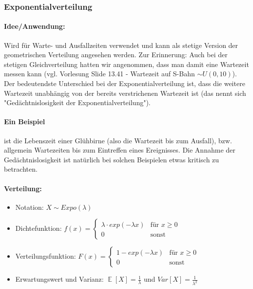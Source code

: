 \documentclass[a4paper]{article}
\DeclareMathOperator*{\E}{\mathbb{E}}
\begin{document}
\noindent {}


\subsubsection{Exponentialverteilung}\label{sec:Expo}

\paragraph{Idee/Anwendung:} Wird für Warte- und Ausfallzeiten verwendet und kann als stetige Version der geometrischen Verteilung angesehen werden. Zur Erinnerung: Auch bei der stetigen Gleichverteilung hatten wir angenommen, dass man damit eine Wartezeit messen kann (vgl. Vorlesung Slide 13.41 - Wartezeit auf S-Bahn $\sim U(0,10)$). Der bedeutendste Unterschied bei der Exponentialverteilung ist, dass die weitere Wartezeit unabhängig von der bereits verstrichenen Wartezeit ist (das nennt sich "Gedächtnislosigkeit der Exponentialverteilung").

\paragraph{Ein Beispiel} ist die Lebenszeit einer Glühbirne (also die Wartezeit bis zum Ausfall), bzw. allgemein Wartezeiten bis zum Eintreffen eines Ereignisses. Die Annahme der Gedächtnislosigkeit ist natürlich bei solchen Beispielen etwas kritisch zu betrachten.

\paragraph{Verteilung:}
\begin{itemize}
\item[] Notation: $X \sim Expo(\lambda)$
\item[] Dichtefunktion: $f(x)=\begin{cases}
			\lambda \cdot exp(-\lambda x) & \text{für $x \geq 0$}\\
            0 & \text{sonst}
		 \end{cases}$ 
\item[] Verteilungsfunktion: $F(x)=\begin{cases}
			1 - exp(-\lambda x) & \text{für $x \geq 0$}\\
            0 & \text{sonst}
		 \end{cases}$ 
\item[] Erwartungswert und Varianz: $\E[X]= \frac{1}{\lambda}$ und $Var[X]=\frac{1}{\lambda^2}$

\end{itemize}
\end{document}
